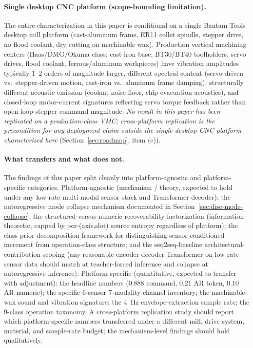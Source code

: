 \documentclass[sensors,article,submit,moreauthors,pdftex]{Definitions/mdpi}
\begin{document}
\paragraph{Single desktop CNC platform (scope-bounding limitation).} The entire characterization in this paper is conditional on a single Bantam Tools desktop mill platform (cast-aluminum frame, ER11 collet spindle, stepper drive, no flood coolant, dry cutting on machinable wax). Production vertical machining centers (Haas/DMG/Okuma class: cast-iron base, BT30/BT40 toolholders, servo drives, flood coolant, ferrous/aluminum workpieces) have vibration amplitudes typically $1$--$2$ orders of magnitude larger, different spectral content (servo-driven vs.\ stepper-driven motion, cast-iron vs.\ aluminum frame damping), structurally different acoustic emission (coolant noise floor, chip-evacuation acoustics), and closed-loop motor-current signatures reflecting servo torque feedback rather than open-loop stepper-command magnitude. \emph{No result in this paper has been replicated on a production-class VMC; cross-platform replication is the precondition for any deployment claim outside the single desktop CNC platform characterized here} (Section~\ref{sec:roadmap}, item (e)).

\paragraph{What transfers and what does not.} The findings of this paper split cleanly into platform-agnostic and platform-specific categories. Platform-agnostic (mechanism / theory, expected to hold under any low-rate multi-modal sensor stack and Transformer decoder): the autoregressive mode collapse mechanism documented in Section~\ref{sec:disc-mode-collapse}; the structured-versus-numeric recoverability factorization (information-theoretic, capped by per-(axis,slot) source entropy regardless of platform); the class-prior decomposition framework for distinguishing sensor-conditioned increment from operation-class structure; and the seq2seq-baseline architectural-contribution-scoping (any reasonable encoder-decoder Transformer on low-rate sensor data should match at teacher-forced inference and collapse at autoregressive inference). Platform-specific (quantitative, expected to transfer with adjustment): the headline numbers ($0.888$ command, $0.21$ AR token, $0.10$ AR numeric); the specific 6-sensor 7-modality channel inventory; the machinable-wax sound and vibration signature; the 4~Hz envelope-extraction sample rate; the 9-class operation taxonomy. A cross-platform replication study should report which platform-specific numbers transferred under a different mill, drive system, material, and sample-rate budget; the mechanism-level findings should hold qualitatively.
\end{document}
